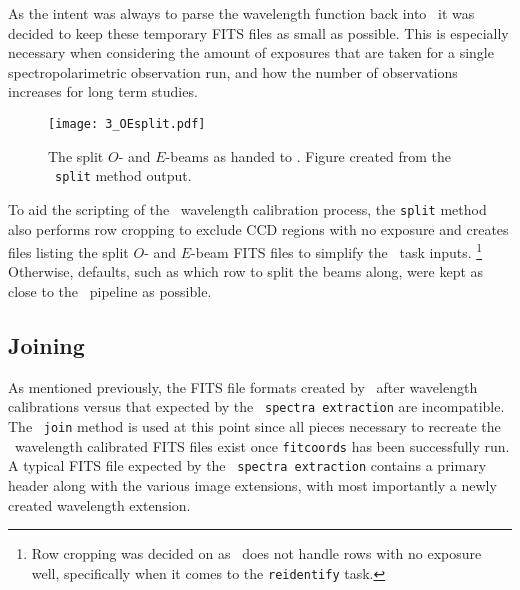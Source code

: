 As the intent was always to parse the wavelength function back into \polsalt\ it was decided to keep these temporary \gls{FITS} files as small as possible. This is especially necessary when considering the amount of exposures that are taken for a single spectropolarimetric observation run, and how the number of observations increases for long term studies.

\begin{figure}[t]
    \centering
    \texttt{[image: 3\_OEsplit.pdf]}
    \caption{The split $O$- and $E$-beams as handed to \iraf. Figure created from the \stops\ \texttt{split} method output.}
    \label{fig:OE_split}
\end{figure}

To aid the scripting of the \iraf\ wavelength calibration process, the \texttt{split} method also performs row cropping to exclude \gls{CCD} regions with no exposure and creates files listing the split $O$- and $E$-beam \gls{FITS} files to simplify the \iraf\ task inputs.%
\footnote{Row cropping was decided on as \iraf\ does not handle rows with no exposure well, specifically when it comes to the \texttt{reidentify} task.}
Otherwise, defaults, such as which row to split the beams along, were kept as close to the \polsalt\ pipeline as possible.

\pagebreak

\subsection{Joining} \label{subsec:stops_join}



As mentioned previously, the \gls{FITS} file formats created by \iraf\ after wavelength calibrations versus that expected by the \polsalt\ \texttt{spectra extraction} are incompatible. The \stops\ \texttt{join} method is used at this point since all pieces necessary to recreate the \polsalt\ wavelength calibrated \gls{FITS} files exist once \texttt{fitcoords} has been successfully run. A typical \gls{FITS} file expected by the \polsalt\ \texttt{spectra extraction} contains a primary header along with the various image extensions, with most importantly a newly created wavelength extension.

